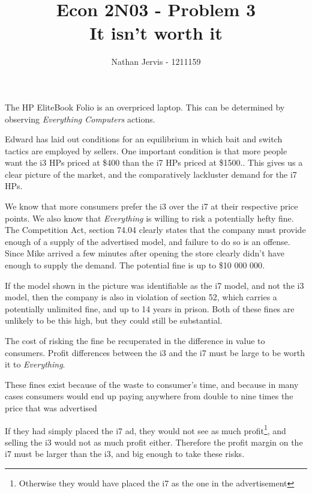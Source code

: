 \documentclass[12pt]{article}
\title{\vspace{-3.5cm}Econ 2N03 - Problem 3\\It isn't worth it}
\author{Nathan Jervis - 1211159}
\newcommand\italics[1]{\textit{#1}}
\begin{document}
\maketitle


The HP EliteBook Folio is an overpriced laptop. This can be determined by observing \italics{Everything Computers} actions.

Edward\cite{baitSwitch} has laid out conditions for an equilibrium in which bait and switch tactics are employed by sellers. One important condition is that more people want the i3 HPs priced at \$400 than the i7 HPs priced at \$1500.\cite[pg. 818]{baitSwitch}. This gives us a clear picture of the market, and the comparatively lackluster demand for the i7 HPs.

We know that more consumers prefer the i3 over the i7 at their respective price points. We also know that \italics{Everything} is willing to risk a potentially hefty fine. The Competition Act, section 74.04 clearly states that the company must provide enough of a supply of the advertised model, and failure to do so is an offense. Since Mike arrived a few minutes after opening \cite[para 3]{problem} the store clearly didn't have enough to supply the demand. The potential fine is up to \$10 000 000\cite[74.1]{compAct}.

If the model shown in the picture was identifiable as the i7 model, and not the i3 model, then the company is also in violation of section 52, which carries a potentially unlimited fine, and up to 14 years in prison.\cite[52.5.a]{compAct} Both of these fines are unlikely to be this high, but they could still be substantial.

The cost of risking the fine be recuperated in the difference in value to consumers. Profit differences between the i3 and the i7 must be large to be worth it to \italics{Everything}.

These fines exist because of the waste to consumer's time, and because in many cases consumers would end up paying anywhere from double to nine times the price that was advertised\cite[pg. 274]{badBait}

If they had simply placed the i7 ad, they would not see as much profit\footnote{Otherwise they would have placed the i7 as the one in the advertisement}, and selling the i3 would not as much profit either. Therefore the profit margin on the i7 must be larger than the i3, and big enough to take these risks. 
\end{document}
